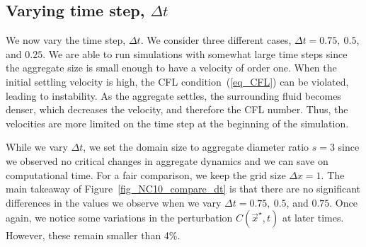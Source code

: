 \subsection{Varying time step, $\Delta t$}
We now vary the time step, $\Delta t$. We consider three different cases, $\Delta t = 0.75, \ 0.5$, and $0.25$. We are able to run simulations with somewhat large time steps since the aggregate size is small enough to have a velocity of order one. When the initial settling velocity is high, the CFL condition~(\ref{eq_CFL}) can be violated, leading to instability. As the aggregate settles, the surrounding fluid becomes denser, which decreases the velocity, and therefore the CFL number. Thus, the velocities are more limited on the time step at the beginning of the simulation. 
\par
While we vary $\Delta t$, we set the domain size to aggregate diameter ratio $s = 3$ since we observed no critical changes in aggregate dynamics and we can save on computational time. For a fair comparison, we keep the grid size $\Delta x =1$. 
The main takeaway of Figure~\ref{fig_NC10_compare_dt} is that there are no significant differences in the values we observe when we vary $\Delta t = 0.75, \ 0.5$, and $0.75$. Once again, we notice some variations in the perturbation $C(\vec{x}^{\star},t)$ at later times. 
However, these remain smaller than 4\%.
